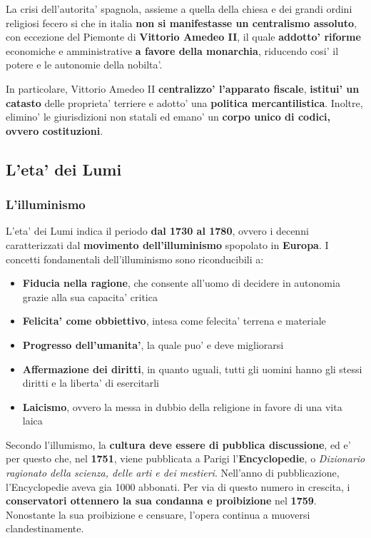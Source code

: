 \documentclass{article}
\begin{document}
{{    La crisi dell'autorita' spagnola, assieme a quella della chiesa e dei grandi ordini religiosi fecero si che in italia \textbf{non si manifestasse un centralismo assoluto}, con eccezione del Piemonte di \textbf{Vittorio Amedeo II}, il quale \textbf{addotto' riforme} economiche e amministrative \textbf{a favore della monarchia}, riducendo cosi' il potere e le autonomie della nobilta'.

    In particolare, Vittorio Amedeo II \textbf{centralizzo' l'apparato fiscale}, \textbf{istitui' un catasto} delle proprieta' terriere e adotto' una \textbf{politica mercantilistica}. Inoltre, elimino' le giurisdizioni non statali ed emano' un \textbf{corpo unico di codici, ovvero costituzioni}.

    \subsection{L'eta' dei Lumi}
    \subsubsection{L'illuminismo} %
    L'eta' dei Lumi indica il periodo \textbf{dal 1730 al 1780}, ovvero i decenni caratterizzati dal \textbf{movimento dell'illuminismo} spopolato in \textbf{Europa}. I concetti fondamentali dell'illuminismo sono riconducibili a:

    \begin{itemize}
      \item \textbf{Fiducia nella ragione}, che consente all'uomo di decidere in autonomia grazie alla sua capacita' critica
      \item \textbf{Felicita' come obbiettivo}, intesa come felecita' terrena e materiale
      \item \textbf{Progresso dell'umanita'}, la quale puo' e deve migliorarsi
      \item \textbf{Affermazione dei diritti}, in quanto uguali, tutti gli uomini hanno gli stessi diritti e la liberta' di esercitarli
      \item \textbf{Laicismo}, ovvero la messa in dubbio della religione in favore di una vita laica
    \end{itemize}

    Secondo l'illumismo, la \textbf{cultura deve essere di pubblica discussione}, ed e' per questo che, nel \textbf{1751}, viene pubblicata a Parigi l'\textbf{Encyclopedie}, o \textit{Dizionario ragionato della scienza, delle arti e dei mestieri}. Nell'anno di pubblicazione, l'Encyclopedie aveva gia 1000 abbonati. Per via di questo numero in crescita, i \textbf{conservatori ottennero la sua condanna e proibizione} nel \textbf{1759}. Nonostante la sua proibizione e censuare, l'opera continua a muoversi clandestinamente.

}}
\end{document}
